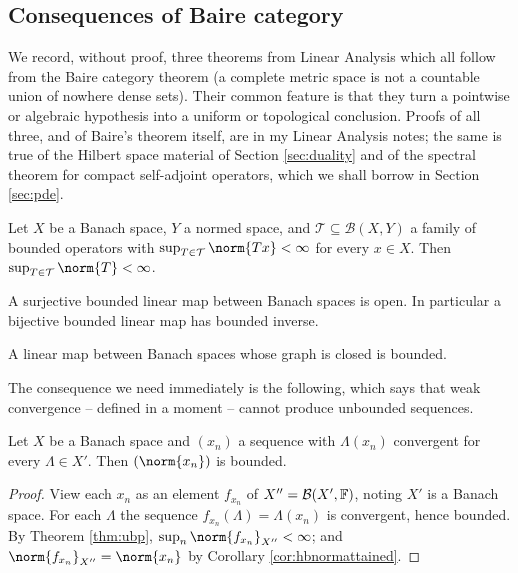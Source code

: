 \documentclass[a4paper]{scrartcl}
\begin{document}
\subsection{Consequences of Baire category}

We record, without proof, three theorems from Linear Analysis which all follow from the Baire category theorem (a complete metric space is not a countable union of nowhere dense sets). Their common feature is that they turn a pointwise or algebraic hypothesis into a uniform or topological conclusion. Proofs of all three, and of Baire's theorem itself, are in my Linear Analysis notes; the same is true of the Hilbert space material of Section \ref{sec:duality} and of the spectral theorem for compact self-adjoint operators, which we shall borrow in Section \ref{sec:pde}.

\begin{theorem}\label{thm:ubp}
	Let $X$ be a Banach space, $Y$ a normed space, and $\mathcal{T} \subseteq \mathcal{B}(X,Y)$ a family of bounded operators with $\sup_{T \in \mathcal{T}}\norm{Tx} < \infty$ for every $x \in X$. Then $\sup_{T\in\mathcal{T}}\norm{T} < \infty$.
\end{theorem}

\begin{theorem}\label{thm:omt}
	A surjective bounded linear map between Banach spaces is open. In particular a bijective bounded linear map has bounded inverse.
\end{theorem}

\begin{theorem}\label{thm:cgt}
	A linear map between Banach spaces whose graph is closed is bounded.
\end{theorem}

The consequence we need immediately is the following, which says that weak convergence -- defined in a moment -- cannot produce unbounded sequences.

\begin{proposition}\label{prop:weakbounded}
	Let $X$ be a Banach space and $(x_n)$ a sequence with $\Lambda(x_n)$ convergent for every $\Lambda \in X'$. Then $(\norm{x_n})$ is bounded.
\end{proposition}

\begin{proof}
	View each $x_n$ as an element $f_{x_n}$ of $X'' = \mathcal{B}(X', \mathbb{F})$, noting $X'$ is a Banach space. For each $\Lambda$ the sequence $f_{x_n}(\Lambda) = \Lambda(x_n)$ is convergent, hence bounded. By Theorem \ref{thm:ubp}, $\sup_n \norm{f_{x_n}}_{X''} < \infty$; and $\norm{f_{x_n}}_{X''} = \norm{x_n}$ by Corollary \ref{cor:hbnormattained}.
\end{proof}
\end{document}
